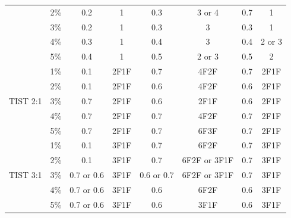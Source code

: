 \documentclass[pgmicro,mestrado,english]{iiufrgs}
\begin{document}
\begin{table}[]
{\begin{tabular}{|c|c|c|c|c|c|c|c|}
                          & 2\% & 0.2        & 1      & 0.3        & 3 or 4       & 0.7        & 1      \\ \cline{2-8} 
                          & 3\% & 0.2        & 1      & 0.3        & 3            & 0.3        & 1      \\ \cline{2-8} 
                          & 4\% & 0.3        & 1      & 0.4        & 3            & 0.4        & 2 or 3 \\ \cline{2-8} 
                          & 5\% & 0.4        & 1      & 0.5        & 2 or 3       & 0.5        & 2      \\ \hline
\multirow{5}{*}{TIST 2:1} & 1\% & 0.1        & 2F1F   & 0.7        & 4F2F         & 0.7        & 2F1F   \\ \cline{2-8} 
                          & 2\% & 0.1        & 2F1F   & 0.6        & 4F2F         & 0.6        & 2F1F   \\ \cline{2-8} 
                          & 3\% & 0.7        & 2F1F   & 0.6        & 2F1F         & 0.6        & 2F1F   \\ \cline{2-8} 
                          & 4\% & 0.7        & 2F1F   & 0.7        & 4F2F         & 0.7        & 2F1F   \\ \cline{2-8} 
                          & 5\% & 0.7        & 2F1F   & 0.7        & 6F3F         & 0.7        & 2F1F   \\ \hline
\multirow{5}{*}{TIST 3:1} & 1\% & 0.1        & 3F1F   & 0.7        & 6F2F         & 0.7        & 3F1F   \\ \cline{2-8} 
                          & 2\% & 0.1        & 3F1F   & 0.7        & 6F2F or 3F1F & 0.7        & 3F1F   \\ \cline{2-8} 
                          & 3\% & 0.7 or 0.6 & 3F1F   & 0.6 or 0.7 & 6F2F or 3F1F & 0.7        & 3F1F   \\ \cline{2-8} 
                          & 4\% & 0.7 or 0.6 & 3F1F   & 0.6        & 6F2F         & 0.6        & 3F1F   \\ \cline{2-8} 
                          & 5\% & 0.7 or 0.6 & 3F1F   & 0.6        & 3F1F         & 0.6        & 3F1F   \\ \hline
\end{tabular}
}
\end{table}
\end{document}
